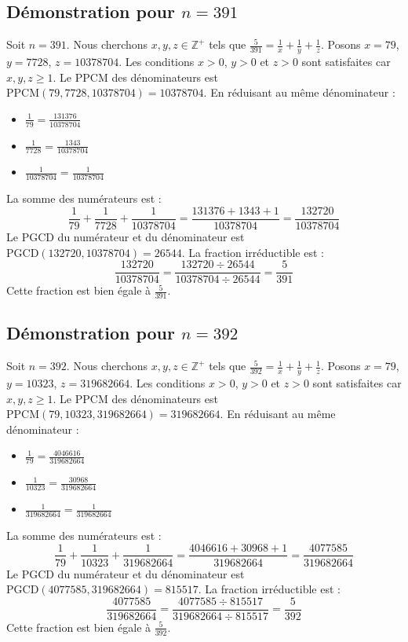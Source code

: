 \documentclass[11pt,a4paper]{article}
\begin{document}
\subsection{Démonstration pour $n = 391$}
Soit $n = 391$. Nous cherchons $x, y, z \in \mathbb{Z}^{+}$ tels que $\frac{5}{391} = \frac{1}{x} + \frac{1}{y} + \frac{1}{z}$.
Posons $x = 79$, $y = 7728$, $z = 10378704$.
Les conditions $x > 0$, $y > 0$ et $z > 0$ sont satisfaites car $x, y, z \geq 1$.
Le PPCM des dénominateurs est $\text{PPCM}(79, 7728, 10378704) = 10378704$.
En réduisant au même dénominateur :
\begin{itemize}
    \item $\frac{1}{79} = \frac{131376}{10378704}$
    \item $\frac{1}{7728} = \frac{1343}{10378704}$
    \item $\frac{1}{10378704} = \frac{1}{10378704}$
\end{itemize}
La somme des numérateurs est :
$$ \frac{1}{79} + \frac{1}{7728} + \frac{1}{10378704} = \frac{131376 + 1343 + 1}{10378704} = \frac{132720}{10378704} $$
Le PGCD du numérateur et du dénominateur est $\text{PGCD}(132720, 10378704) = 26544$.
La fraction irréductible est :
$$ \frac{132720}{10378704} = \frac{132720 \div 26544}{10378704 \div 26544} = \frac{5}{391} $$
Cette fraction est bien égale à $\frac{5}{391}$.

\subsection{Démonstration pour $n = 392$}
Soit $n = 392$. Nous cherchons $x, y, z \in \mathbb{Z}^{+}$ tels que $\frac{5}{392} = \frac{1}{x} + \frac{1}{y} + \frac{1}{z}$.
Posons $x = 79$, $y = 10323$, $z = 319682664$.
Les conditions $x > 0$, $y > 0$ et $z > 0$ sont satisfaites car $x, y, z \geq 1$.
Le PPCM des dénominateurs est $\text{PPCM}(79, 10323, 319682664) = 319682664$.
En réduisant au même dénominateur :
\begin{itemize}
    \item $\frac{1}{79} = \frac{4046616}{319682664}$
    \item $\frac{1}{10323} = \frac{30968}{319682664}$
    \item $\frac{1}{319682664} = \frac{1}{319682664}$
\end{itemize}
La somme des numérateurs est :
$$ \frac{1}{79} + \frac{1}{10323} + \frac{1}{319682664} = \frac{4046616 + 30968 + 1}{319682664} = \frac{4077585}{319682664} $$
Le PGCD du numérateur et du dénominateur est $\text{PGCD}(4077585, 319682664) = 815517$.
La fraction irréductible est :
$$ \frac{4077585}{319682664} = \frac{4077585 \div 815517}{319682664 \div 815517} = \frac{5}{392} $$
Cette fraction est bien égale à $\frac{5}{392}$.
\end{document}
